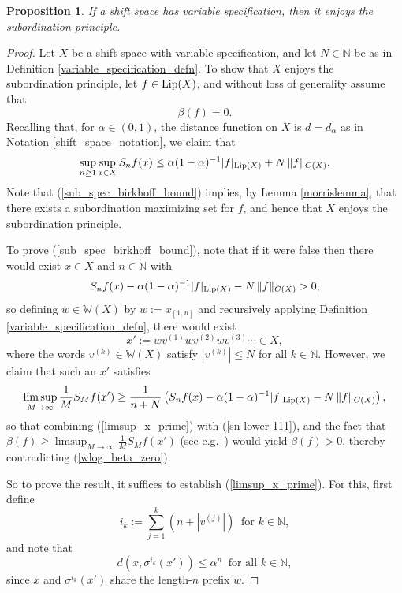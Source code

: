 \documentclass[reqno,11pt]{amsart}
\newtheorem{prop}[thm]{Proposition}
\theoremstyle{definition}
\theoremstyle{remark}
\theoremstyle{remark}
\def \N {\mathbb N}
\def\lip{{\rm Lip}}
\def\w{\mathbb{W}}
\numberwithin{equation}{section}
\begin{document}
\begin{prop}\label{variable_specification_implies_subordination}
If a shift space has variable specification, then it enjoys the subordination principle.
\end{prop}
\begin{proof}
Let $X$ be a shift space with variable specification, and let $N\in\N$ be as in Definition \ref{variable_specification_defn}. 
To show that $X$ enjoys the subordination principle, let $f\in\lip(X)$,
and without loss of generality assume that 
\begin{equation}\label{wlog_beta_zero}
\beta(f)=0.
\end{equation}
Recalling that, for $\alpha\in(0,1)$, the distance function on $X$ is $d=d_\alpha$ as in Notation \ref{shift_space_notation},
we claim that
\begin{equation}\label{sub_spec_birkhoff_bound}
\sup_{n\ge 1}\sup_{x\in X} S_nf(x)\le \alpha(1-\alpha)^{-1} |f|_{\lip(X)}+N \, \|f\|_{C(X)}.
\end{equation}
Note that (\ref{sub_spec_birkhoff_bound}) implies,
by Lemma \ref{morrislemma}, that there exists a subordination maximizing set for $f$, and hence that $X$ enjoys the subordination principle.

To prove (\ref{sub_spec_birkhoff_bound}), note that if it were false then there 
would exist $x\in X$ and $n\in\mathbb{N}$ with
\begin{equation}\label{sn-lower-111}
S_nf(x)- \alpha(1-\alpha)^{-1} |f|_{\lip(X)} - N\, \|f\|_{C(X)}>0,
\end{equation}
so defining $w\in\w(X)$ by $w:=x_{[1,n]}$
and recursively applying Definition \ref{variable_specification_defn},
there would exist 
$$x':=wv^{(1)}wv^{(2)}wv^{(3)}\cdots\in X,$$
where the words $v^{(k)}\in \w(X)$ satisfy $|v^{(k)}|\le N$ for all $k\in\N$.
However, we claim that such an $x'$ satisfies
\begin{equation}\label{limsup_x_prime}
\limsup_{M\to\infty} \frac{1}{M} S_Mf(x')
\ge 
\frac{1}{n+N}\left( S_nf(x)- \alpha(1-\alpha)^{-1} |f|_{\lip(X)} - N\, \|f\|_{C(X)} \right),
\end{equation}
so that combining
 (\ref{limsup_x_prime}) with  (\ref{sn-lower-111}),
and the fact that
$\beta(f)\ge \limsup_{M\to\infty} \frac{1}{M} S_Mf(x')$
(see e.g.~\cite[Prop.~2.2]{Jen06})
 would yield
$
\beta(f)>0
$, thereby contradicting (\ref{wlog_beta_zero}).

So to prove the result, it suffices to establish (\ref{limsup_x_prime}).
For this, first define
\begin{equation}\label{i_k_defn}
i_k := \sum_{j=1}^k \left(n + |v^{(j)}| \right) \ \text{ for }k\in\N,
\end{equation}
and note that
\begin{equation}\label{close_returns}
d\left(x, \sigma^{i_k}(x')\right) \le \alpha^n \ \text{ for all } k\in\N,
\end{equation}
since $x$ and $\sigma^{i_k}(x')$ share the length-$n$ prefix $w$.


\end{proof}
\end{document}
